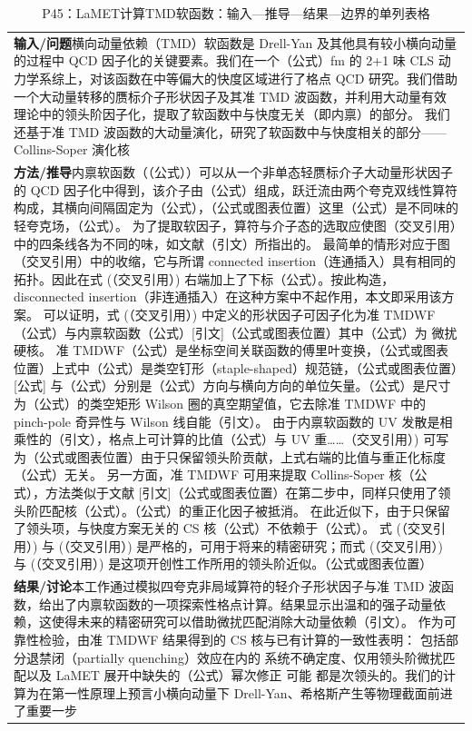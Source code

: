 \documentclass[UTF8,11pt,oneside]{ctexbook}
\begin{document}
\begin{table}[htbp]
  \centering
  \caption*{P45：LaMET计算TMD软函数：输入—推导—结果—边界的单列表格}
  \small
  \begin{tabular}{@{}p{}@{}}
    \toprule
    \textbf{输入/问题}\quad 横向动量依赖（TMD）软函数是 Drell-Yan 及其他具有较小横向动量的过程中 QCD 因子化的关键要素。我们在一个（公式）fm 的 2+1 味 CLS 动力学系综上，对该函数在中等偏大的快度区域进行了格点 QCD 研究。我们借助一个大动量转移的赝标介子形状因子及其准 TMD 波函数，并利用大动量有效理论中的领头阶因子化，提取了软函数中与快度无关（即内禀）的部分。 我们还基于准 TMD 波函数的大动量演化，研究了软函数中与快度相关的部分——Collins-Soper 演化核 \\
    \textbf{方法/推导}\quad 内禀软函数（（公式））可以从一个非单态轻赝标介子大动量形状因子的 QCD 因子化中得到，该介子由（公式）组成，跃迁流由两个夸克双线性算符构成，其横向间隔固定为（公式），（公式或图表位置）这里（公式）是不同味的轻夸克场，（公式）。 为了提取软因子，算符与介子态的选取应使图（交叉引用）中的四条线各为不同的味，如文献（引文）所指出的。 最简单的情形对应于图（交叉引用）中的收缩，它与所谓 connected insertion（连通插入）具有相同的拓扑。因此在式 (（交叉引用）) 右端加上了下标（公式）。按此构造，disconnected insertion（非连通插入）在这种方案中不起作用，本文即采用该方案。 可以证明，式 (（交叉引用）) 中定义的形状因子可因子化为准 TMDWF（公式）与内禀软函数（公式）[引文]（公式或图表位置）其中（公式）为 微扰 硬核。 准 TMDWF（公式）是坐标空间关联函数的傅里叶变换，（公式或图表位置）上式中（公式）是类空钉形（staple-shaped）规范链，（公式或图表位置）[公式] 与（公式）分别是（公式）方向与横向方向的单位矢量。（公式）是尺寸为（公式）的类空矩形 Wilson 圈的真空期望值，它去除准 TMDWF 中的 pinch-pole 奇异性与 Wilson 线自能（引文）。 由于内禀软函数的 UV 发散是相乘性的（引文），格点上可计算的比值（公式）与 UV 重……（交叉引用）) 可写为（公式或图表位置）由于只保留领头阶贡献，上式右端的比值与重正化标度（公式）无关。 另一方面，准 TMDWF 可用来提取 Collins-Soper 核（公式），方法类似于文献 [引文]（公式或图表位置）在第二步中，同样只使用了领头阶匹配核（公式）。（公式）的重正化因子被抵消。 在此近似下，由于只保留了领头项，与快度方案无关的 CS 核（公式）不依赖于（公式）。 式 (（交叉引用）) 与 (（交叉引用）) 是严格的，可用于将来的精密研究；而式 (（交叉引用）) 与 (（交叉引用）) 是这项开创性工作所用的领头阶近似。（公式或图表位置） \\
    \textbf{结果/讨论}\quad 本工作通过模拟四夸克非局域算符的轻介子形状因子与准 TMD 波函数，给出了内禀软函数的一项探索性格点计算。结果显示出温和的强子动量依赖，这使得未来的精密研究可以借助微扰匹配消除大动量依赖（引文）。 作为可靠性检验，由准 TMDWF 结果得到的 CS 核与已有计算的一致性表明： 包括部分退禁闭（partially quenching）效应在内的 系统不确定度、仅用领头阶微扰匹配以及 LaMET 展开中缺失的（公式）幂次修正 可能 都是次领头的。我们的计算为在第一性原理上预言小横向动量下 Drell-Yan、希格斯产生等物理截面前进了重要一步 \\

\end{tabular}
\end{table}
\end{document}
